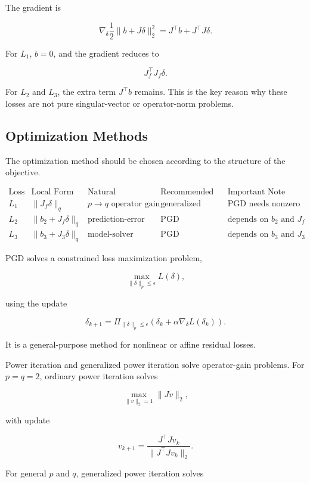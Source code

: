 \documentclass{article}
\begin{document}
The gradient is

\[
\nabla_\delta
\frac12\|b+J\delta\|_2^2
=
J^\top b+J^\top J\delta.
\]

For \(L_1\), \(b=0\), and the gradient reduces to

\[
J_f^\top J_f\delta.
\]

For \(L_2\) and \(L_3\), the extra term \(J^\top b\) remains. This is the key reason why these losses are not pure singular-vector or operator-norm problems.

\subsection{Optimization Methods}

The optimization method should be chosen according to the structure of the objective.

\[
\begin{array}{c|c|c|c|c}
\text{Loss} 
& \text{Local Form}
& \text{Natural Interpretation}
& \text{Recommended Method}
& \text{Important Note}
\\
\hline
L_1
&
\|J_f\delta\|_q
&
p\to q \text{ operator gain}
&
\text{generalized power iteration}
&
\text{PGD needs nonzero initialization}
\\
L_2
&
\|b_2+J_f\delta\|_q
&
\text{prediction-error maximization}
&
\text{PGD}
&
\text{depends on } b_2 \text{ and } J_f
\\
L_3
&
\|b_3+J_3\delta\|_q
&
\text{model-solver residual maximization}
&
\text{PGD}
&
\text{depends on } b_3 \text{ and } J_3
\end{array}
\]

PGD solves a constrained loss maximization problem,

\[
\max_{\|\delta\|_p\le \epsilon} L(\delta),
\]

using the update

\[
\delta_{k+1}
=
\Pi_{\|\delta\|_p\le\epsilon}
\left(
\delta_k+\alpha \nabla_\delta L(\delta_k)
\right).
\]

It is a general-purpose method for nonlinear or affine residual losses.

Power iteration and generalized power iteration solve operator-gain problems. For \(p=q=2\), ordinary power iteration solves

\[
\max_{\|v\|_2=1}\|Jv\|_2,
\]

with update

\[
v_{k+1}
=
\frac{J^\top Jv_k}{\|J^\top Jv_k\|_2}.
\]

For general \(p\) and \(q\), generalized power iteration solves
\end{document}
